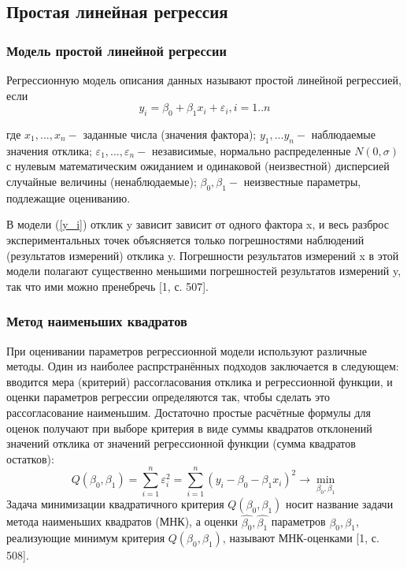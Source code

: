 \documentclass[a4paper,14pt]{article}
\begin{document}
	\subsection{Простая линейная регрессия}
	\subsubsection{Модель простой линейной регрессии}
	\noindent Регрессионную модель описания данных называют простой линейной регрессией, если
	\begin{equation}
		y_{i} = \beta_{0} + \beta_{1}x_{i} + \varepsilon_{i},  i = 1..n
		\label{y_i}
	\end{equation}
	
	\noindent где $x_1,...,x_n - $ заданные числа (значения фактора);
	$y_1,...y_n - $ наблюдаемые значения отклика;
	$\varepsilon_1,...,\varepsilon_n - $ независимые, нормально распределенные $N(0, \sigma)$ с нулевым математическим ожиданием и одинаковой (неизвестной) дисперсией случайные величины (ненаблюдаемые);
	$\beta_0, \beta_1 - $ неизвестные параметры, подлежащие оцениванию.
	
	\noindent В модели (\ref{y_i}) отклик y зависит зависит от одного фактора x, и весь разброс экспериментальных точек объясняется только погрешностями наблюдений (результатов измерений) отклика y. Погрешности результатов измерений x в этой модели полагают существенно меньшими погрешностей результатов измерений y, так что ими можно пренебречь [1, с. 507].
	
	\subsubsection{Метод наименьших квадратов}
	\noindent При оценивании параметров регрессионной модели используют различные методы. Один из наиболее распрстранённых подходов заключается в следующем: вводится мера (критерий) рассогласования отклика и регрессионной функции, и оценки параметров регрессии определяются так, чтобы сделать это рассогласование наименьшим. Достаточно простые расчётные формулы для оценок получают при выборе критерия в виде суммы квадратов отклонений значений отклика от значений регрессионной функции (сумма квадратов остатков):
	\begin{equation}
		Q(\beta_{0}, \beta_{1}) = \sum_{i=1}^{n}{\varepsilon_{i}^{2}} = 
		\sum_{i=1}^{n}{(y_{i} - \beta_{0} - \beta_{1}x_{i})^{2}}\rightarrow \min_{\beta_{0}, \beta_{1}}
		\label{Q_beta}
	\end{equation}
	Задача минимизации квадратичного критерия $Q(\beta_0, \beta_1)$ носит название задачи метода наименьших квадратов (МНК), а оценки $\hat{\beta_0}, \hat{\beta_1}$ параметров $\beta_0, \beta_1$, реализующие минимум критерия $Q(\beta_0, \beta_1)$, называют МНК-оценками [1, с. 508]. 
	
\end{document}
